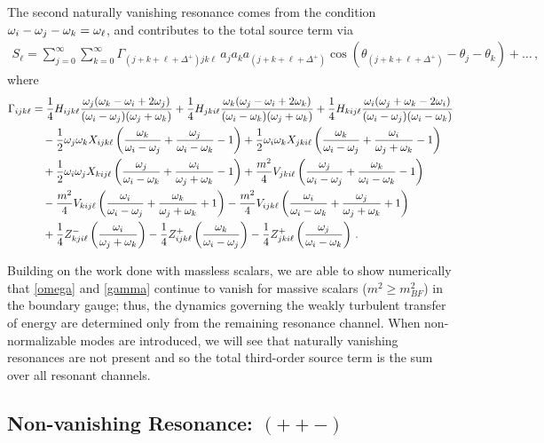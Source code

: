\documentclass[../PhD.tex]{subfiles}
\newcommand{\thj}{\theta_j}
\newcommand{\thk}{\theta_k}
\begin{document}
The second naturally vanishing resonance comes from the condition $\omega_i - \omega_j - \omega_k = \omega_\ell$, and contributes to the total source term via
\begin{align}
S_\ell = \sum_{j=0}^\infty \sum_{k=0}^\infty \Gamma_{(j + k + \ell + \Delta^+) jk\ell} \, a_j a_k a_{(j+k+\ell + \Delta^+)} \cos \left( \theta_{(j+k+\ell + \Delta^+)} - \thj - \thk \right) + \ldots \, ,
\end{align}
where
\begin{align}
\label{gamma}
\Gamma_{ijk\ell} &= \frac{1}{4} H_{ijk\ell} \frac{\oj (\ok - \oi + 2\oj)}{(\oi - \oj)(\oj + \ok)} + \frac{1}{4} H_{jki\ell} \frac{\ok (\oj - \oi + 2\ok)}{(\oi - \ok)(\oj + \ok)} + \frac{1}{4} H_{kij\ell} \frac{\oi (\oj + \ok - 2\oi)}{(\oi - \oj)(\oi - \ok)} \nonumber \\
% 
& \quad -\frac{1}{2} \oj \ok X_{ijk\ell} \left( \frac{\ok}{\oi - \oj} + \frac{\oj}{\oi - \ok} - 1\right) + \frac{1}{2} \oi \ok X_{jki\ell} \left( \frac{\ok}{\oi - \oj} + \frac{\oi}{\oj + \ok} - 1 \right) \nonumber \\
%
& \quad + \frac{1}{2} \oi \oj X_{kij\ell} \left( \frac{\oj}{\oi - \ok} + \frac{\oi}{\oj + \ok} -1 \right) + \frac{m^2}{4} V_{jki\ell} \left( \frac{\oj}{\oi - \oj} + \frac{\ok}{\oi - \ok} -1\right) \nonumber \\
%
& \quad - \frac{m^2}{4} V_{kij\ell} \left( \frac{\oi}{\oi - \oj} + \frac{\ok}{\oj + \ok} + 1\right) - \frac{m^2}{4} V_{ijk\ell} \left( \frac{\oi}{\oi - \ok} + \frac{\oj}{\oj + \ok} + 1 \right) \nonumber \\
%
& \quad + \frac{1}{4} Z^-_{kji\ell} \left( \frac{\oi}{\oj + \ok}\right) - \frac{1}{4} Z^+_{ijk\ell} \left( \frac{\ok}{\oi - \oj} \right) - \frac{1}{4} Z^+_{jki\ell} \left( \frac{\oj}{\oi - \ok}\right) \, .
\end{align}

Building on the work done with massless scalars, we are able to show numerically that \eqref{omega} and \eqref{gamma} continue to vanish for massive scalars ($m^2 \geq m^2_{BF}$) in the boundary gauge; thus, the dynamics governing the weakly turbulent transfer of energy are determined only from the remaining resonance channel. When non-normalizable modes are introduced, we will see that naturally vanishing resonances are not present and so the total third-order source term is the sum over all resonant channels.


\subsection{Non-vanishing Resonance: $(++-)$}
\label{subs: ttf resonances}
\end{document}
